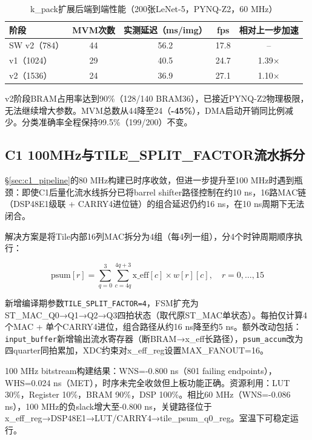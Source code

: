 \documentclass[12pt, a4paper]{article}
\begin{document}
\begin{table}[H]
    \centering
    \caption{k\_pack扩展后端到端性能（200张LeNet-5，PYNQ-Z2，60 MHz）}
    \small
    \begin{tabular}{lcccc}
        \toprule
        阶段 & MVM次数 & 实测延迟（ms/img） & fps & 相对上一步加速 \\
        \midrule
        SW v2（784） & 44 & 56.2 & 17.8 & -- \\
        v1（1024） & 29 & 40.5 & 24.7 & 1.39× \\
        v2（1536） & 24 & 36.9 & 27.1 & 1.10× \\
        \bottomrule
    \end{tabular}
\end{table}

v2阶段BRAM占用率达到90\%（128/140 BRAM36），已接近PYNQ-Z2物理极限，无法继续增大参数。MVM总数从44降至24（\textbf{-45\%}），DMA启动开销同比例减少。分类准确率全程保持99.5\%（199/200）不变。

\subsection{C1 100MHz与TILE\_SPLIT\_FACTOR流水拆分}
\label{sec:c1_100mhz}

§\ref{sec:c1_pipeline}的80 MHz构建已时序收敛，但进一步提升至100 MHz时遇到瓶颈：即使C1后量化流水线拆分已将barrel shifter路径控制在约10 ns，16路MAC链（DSP48E1级联 + CARRY4进位链）的组合延迟仍约16 ns，在10 ns周期下无法闭合。

解决方案是将Tile内部16列MAC拆分为4组（每4列一组），分4个时钟周期顺序执行：

\begin{equation}
    \text{psum}[r] = \sum_{q=0}^{3} \sum_{c=4q}^{4q+3} \text{x\_eff}[c] \times w[r][c], \quad r = 0, \ldots, 15
\end{equation}

新增编译期参数\texttt{TILE\_SPLIT\_FACTOR=4}，FSM扩充为ST\_MAC\_Q0→Q1→Q2→Q3四拍状态（取代原ST\_MAC单状态）。每拍仅计算4个MAC + 单个CARRY4进位，组合路径从约16 ns降至约5 ns。额外改动包括：\texttt{input\_buffer}新增输出流水寄存器（断BRAM→x\_eff长路径），\texttt{psum\_accum}改为四quarter同拍累加，XDC约束对x\_eff\_reg设置MAX\_FANOUT=16。

100 MHz bitstream构建结果：WNS=-0.800 ns（801 failing endpoints），WHS=0.024 ns（MET），时序未完全收敛但上板功能正确。资源利用：LUT 30\%，Register 10\%，BRAM 90\%，DSP 100\%。相比60 MHz（WNS=-0.086 ns），100 MHz的负slack增大至-0.800 ns，关键路径位于x\_eff\_reg→DSP48E1→LUT/CARRY4→tile\_psum\_q0\_reg。室温下可稳定运行。
\end{document}
